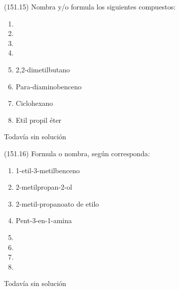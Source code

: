   \begin{exercise}[
      tags    = {},
      topics  = {química, química orgánica, orgánica},
      source  = {FQ 1B MGH 2016, p151, e15},
    ]
    (151.15) Nombra y/o formula los siguientes compuestos:
    \begin{enumerate}
      \item {}
      \item {}
      \item {}
      \item {}
      \item 2,2-dimetilbutano
      \item Para-diaminobenceno
      \item Ciclohexano
      \item Etil propil éter
    \end{enumerate}
  \end{exercise}

  \begin{solution}[print=false]
    Todavía sin solución
  \end{solution}




  \begin{exercise}[
      tags    = {},
      topics  = {química, química orgánica, orgánica},
      source  = {FQ 1B MGH 2016, p151, e16},
    ]
    (151.16) Formula o nombra, según corresponda:
    \begin{enumerate}
      \item 1-etil-3-metilbenceno
      \item 2-metilpropan-2-ol
      \item 2-metil-propanoato de etilo
      \item Pent-3-en-1-amina
      \item {}
      \item {}
      \item {}
      \item {}
    \end{enumerate}
  \end{exercise}

  \begin{solution}[print=false]
    Todavía sin solución
  \end{solution}




